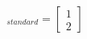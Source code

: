 \documentclass[preview]{standalone}
\begin{document}
\begin{align*}
[\vec{v}]_{standard} = \begin{bmatrix} 1 \\ 2 \end{bmatrix}
\end{align*}
\end{document}
